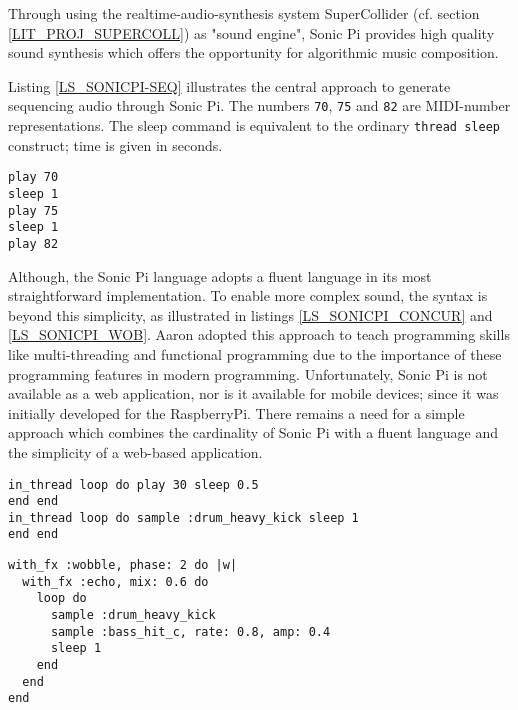 Through using the realtime-audio-synthesis system SuperCollider (cf. section \ref{LIT_PROJ_SUPERCOLL}) as "sound engine", Sonic Pi provides high quality sound synthesis which offers the opportunity for algorithmic music composition.

Listing \ref{LS_SONICPI-SEQ} illustrates the central approach to generate sequencing audio through Sonic Pi. The numbers \texttt{70}, \texttt{75} and \texttt{82} are MIDI-number representations. The sleep command is equivalent to the ordinary \texttt{thread sleep} construct; time is given in seconds.

\begin{lstlisting}[caption={Sonic Pi Sequencing Model\cite{Aaron2016Art}}, label=LS_SONICPI-SEQ]
play 70
sleep 1
play 75
sleep 1
play 82
\end{lstlisting}

Although, the Sonic Pi language adopts a fluent language in its most straightforward implementation. To enable more complex sound, the syntax is beyond this simplicity, as illustrated in listings \ref{LS_SONICPI_CONCUR} and \ref{LS_SONICPI_WOB}. Aaron adopted this approach to teach programming skills like multi-threading and functional programming due to the importance of these programming features in modern programming.\cite{Aaron2014} Unfortunately, Sonic Pi is not available as a web application, nor is it available for mobile devices; since it was initially developed for the RaspberryPi. There remains a need for a simple approach which combines the cardinality of Sonic Pi with a fluent language and the simplicity of a web-based application.

\begin{lstlisting}[caption={Sonic Pi Example - Concurrency\cite{Aaron2014}}, label=LS_SONICPI_CONCUR]
in_thread loop do play 30 sleep 0.5
end end
in_thread loop do sample :drum_heavy_kick sleep 1
end end
\end{lstlisting}
	
\begin{lstlisting}[caption={Sonic Pi Example - Wobling Sound\cite{SonicPi}}, label=LS_SONICPI_WOB]
with_fx :wobble, phase: 2 do |w|
  with_fx :echo, mix: 0.6 do
    loop do
      sample :drum_heavy_kick
      sample :bass_hit_c, rate: 0.8, amp: 0.4
      sleep 1
    end
  end
end
\end{lstlisting}


